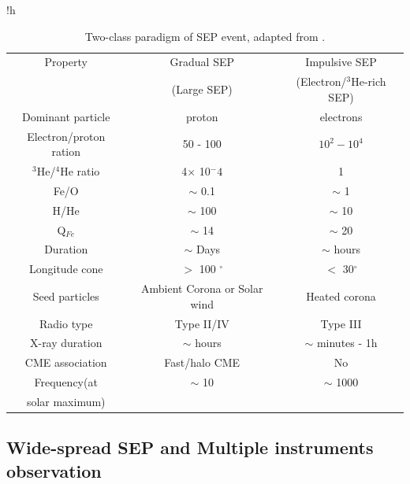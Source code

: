 \begin{table}{!h}
	\centering
	\caption[Two classes of SEP events]{Two-class paradigm of \ac{SEP} event, adapted from \citet{kallenrode2003current,	Desai_Diacalone2016LRSP, Wang2009}.}
	\begin{tabular}{c|c|c}
		\hline
		\hline
		Property 	& Gradual \ac{SEP} 	& Impulsive \ac{SEP} \\
					& (Large \ac{SEP})	& (Electron/$^3$He-rich \ac{SEP}) \\
		\hline
		Dominant particle	& proton	& electrons \\
		Electron/proton ration &  50 - 100 &  $10^2 - 10^4$  \\
		$^3$He/$^4$He ratio	& 4$\times$ 10$^-4$ & 1 \\
		Fe/O			& $\sim$ 0.1			& $\sim$ 1	 \\
		H/He		 	& $\sim$ 100			& $\sim$ 10 \\
		Q$_{Fe}$		& $\sim$ 14 			& $\sim$ 20 \\
		Duration		& $\sim$ Days			& $\sim$ hours \\
		Longitude cone	& $>$ 100 $^\circ$		& $<$ 30$^\circ$ \\
		Seed particles	& Ambient Corona or Solar wind & Heated corona \\
		Radio type		& Type II/IV	& Type III \\
		X-ray duration	& $\sim$ hours	& $\sim$ minutes - 1h \\
		CME association	& Fast/halo CME	& No	\\
		Frequency(at 	& $\sim$ 10	& $\sim$ 1000 \\
		solar maximum)	& 	& 	\\
		\hline
	\end{tabular}
	\label{Tab:Two_type_SEP}
\end{table}


\subsection{Wide-spread SEP and Multiple instruments observation}


